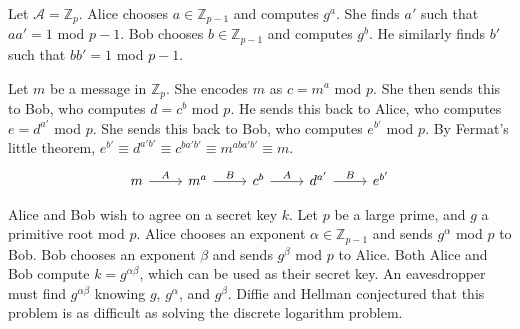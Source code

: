 \begin{example}
    Let \( \mathcal A = \mathbb Z_p \).
    Alice chooses \( a \in \mathbb Z_{p-1} \) and computes \( g^a \).
    She finds \( a' \) such that \( aa' = 1 \) mod \( p-1 \).
    Bob chooses \( b \in \mathbb Z_{p-1} \) and computes \( g^b \).
    He similarly finds \( b' \) such that \( bb' = 1 \) mod \( p-1 \).

    Let \( m \) be a message in \( \mathbb Z_p \).
    She encodes \( m \) as \( c = m^a \) mod \( p \).
    She then sends this to Bob, who computes \( d = c^b \) mod \( p \).
    He sends this back to Alice, who computes \( e = d^{a'} \) mod \( p \).
    She sends this back to Bob, who computes \( e^{b'} \) mod \( p \).
    By Fermat's little theorem, \( e^{b'} \equiv d^{a'b'} \equiv c^{ba'b'} \equiv m^{aba'b'} \equiv m \).
    \[\begin{tikzcd}
        m & {m^a} & {c^b} & {d^{a'}} & {e^{b'}}
        \arrow["A", from=1-1, to=1-2]
        \arrow["B", from=1-2, to=1-3]
        \arrow["A", from=1-3, to=1-4]
        \arrow["B", from=1-4, to=1-5]
    \end{tikzcd}\]
\end{example}
\begin{example}
    Alice and Bob wish to agree on a secret key \( k \).
    Let \( p \) be a large prime, and \( g \) a primitive root mod \( p \).
    Alice chooses an exponent \( \alpha \in \mathbb Z_{p-1} \) and sends \( g^\alpha \) mod \( p \) to Bob.
    Bob chooses an exponent \( \beta \) and sends \( g^\beta \) mod \( p \) to Alice.
    Both Alice and Bob compute \( k = g^{\alpha\beta} \), which can be used as their secret key.
    An eavesdropper must find \( g^{\alpha\beta} \) knowing \( g \), \( g^{\alpha} \), and \( g^{\beta} \).
    Diffie and Hellman conjectured that this problem is as difficult as solving the discrete logarithm problem.
\end{example}


